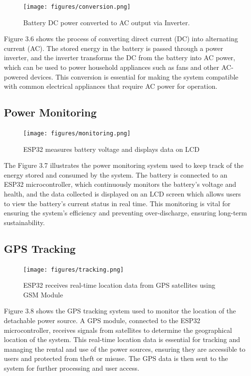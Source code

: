 {\begin{figure}[H]
	\centering
	\caption{Battery DC power converted to AC output via Inverter.}
	\label{fig:energy conversion}
	\texttt{[image: figures/conversion.png]}
\end{figure}

Figure 3.6 shows the process of converting direct current (DC) into alternating current (AC). The stored energy in the  battery is passed through a power inverter, and the inverter transforms the DC from the battery into AC power, which can be used to power household appliances such as fans and other AC-powered devices. This conversion is essential for making the system compatible with common electrical appliances that require AC power for operation.

\subsection{Power Monitoring}

\begin{figure}[H]
	\centering
	\caption{ESP32 measures battery voltage and displays data on LCD}
	\label{fig:power monitoring}
	\texttt{[image: figures/monitoring.png]}
\end{figure}

The Figure 3.7 illustrates the power monitoring system used to keep track of the energy stored and consumed by the system. The  battery is connected to an ESP32 microcontroller, which continuously monitors the battery’s voltage and health, and the data collected is displayed on an LCD screen which allows users to view the battery's current status in real time. This monitoring is vital for ensuring the system's efficiency and preventing over-discharge, ensuring long-term sustainability.


\subsection{GPS Tracking}

\begin{figure}[H]
	\centering
	\caption{ESP32 receives real-time location data from GPS satellites using GSM Module}
	\label{fig:gps tracking}
	\texttt{[image: figures/tracking.png]}
\end{figure}

Figure 3.8 shows the GPS tracking system used to monitor the location of the detachable power source. A GPS module, connected to the ESP32 microcontroller, receives signals from satellites to determine the geographical location of the system. This real-time location data is essential for tracking and managing the rental and use of the power sources, ensuring they are accessible to users and protected from theft or misuse. The GPS data is then sent to the system for further processing and user access.


}
